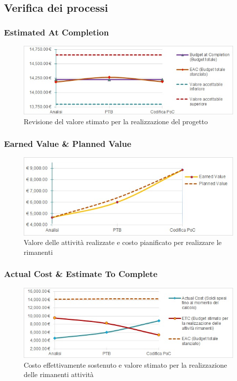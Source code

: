 
\subsection{Verifica dei processi}\label{subsection:verifica_processi}
\subsubsection{Estimated At Completion}
\begin{figure}[H]
  \centering
  \includegraphics[scale=0.8]{immagini/eac.jpg}
  \caption{Revisione del valore stimato per la realizzazione del progetto}
\end{figure}

\subsubsection{Earned Value \& Planned Value}
\begin{figure}[H]
  \centering
  \includegraphics[scale=0.8]{immagini/ev_pv.jpg}
  \caption{Valore delle attività realizzate e costo pianificato per realizzare le rimanenti}
\end{figure}

\subsubsection{Actual Cost \& Estimate To Complete}
\begin{figure}[H]
  \centering
  \includegraphics[scale=0.8]{immagini/ac_etc.jpg}
  \caption{Costo effettivamente sostenuto e valore stimato per la realizzazione delle rimanenti attività}
\end{figure}

